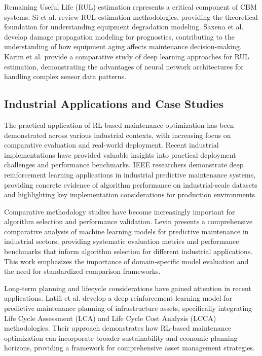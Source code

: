 \documentclass[twocolumn]{article}
\begin{document}
Remaining Useful Life (RUL) estimation represents a critical component of CBM systems. Si et al.\cite{si2011remaining} review RUL estimation methodologies, providing the theoretical foundation for understanding equipment degradation modeling. Saxena et al.\cite{saxena2008prognostics} develop damage propagation modeling for prognostics, contributing to the understanding of how equipment aging affects maintenance decision-making. Karim et al.\cite{karim2020rul} provide a comparative study of deep learning approaches for RUL estimation, demonstrating the advantages of neural network architectures for handling complex sensor data patterns.

\subsection{Industrial Applications and Case Studies}

The practical application of RL-based maintenance optimization has been demonstrated across various industrial contexts, with increasing focus on comparative evaluation and real-world deployment. Recent industrial implementations have provided valuable insights into practical deployment challenges and performance benchmarks. IEEE researchers\cite{ieee2024deeprl} demonstrate deep reinforcement learning applications in industrial predictive maintenance systems, providing concrete evidence of algorithm performance on industrial-scale datasets and highlighting key implementation considerations for production environments.

Comparative methodology studies have become increasingly important for algorithm selection and performance validation. Levin\cite{levin2024enhancing} presents a comprehensive comparative analysis of machine learning models for predictive maintenance in industrial sectors, providing systematic evaluation metrics and performance benchmarks that inform algorithm selection for different industrial applications. This work emphasizes the importance of domain-specific model evaluation and the need for standardized comparison frameworks.

Long-term planning and lifecycle considerations have gained attention in recent applications. Latifi et al.\cite{latifi2021deeprl} develop a deep reinforcement learning model for predictive maintenance planning of infrastructure assets, specifically integrating Life Cycle Assessment (LCA) and Life Cycle Cost Analysis (LCCA) methodologies. Their approach demonstrates how RL-based maintenance optimization can incorporate broader sustainability and economic planning horizons, providing a framework for comprehensive asset management strategies.
\end{document}
